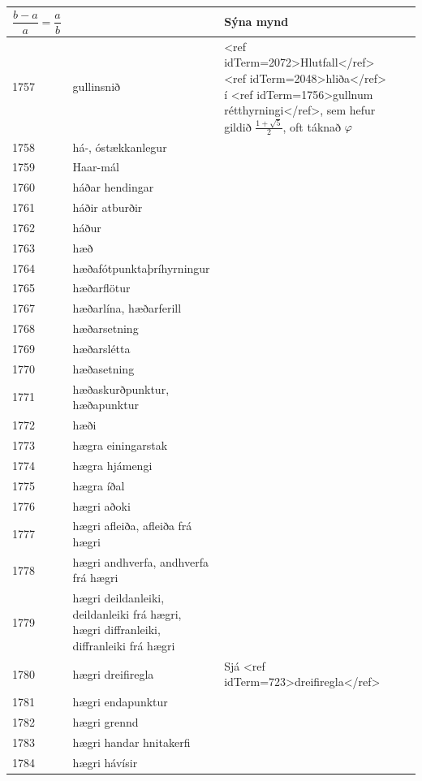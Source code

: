 \begin{longtable}{p{}|p{}|p{}|p{}|p{}}
\[ 
\frac{b-a}{a}=\frac{a}{b}
\] &  & Sýna mynd \\
\hline
1757 & gullinsnið & <ref idTerm=2072>Hlutfall</ref> <ref idTerm=2048>hliða</ref> í <ref idTerm=1756>gullnum rétthyrningi</ref>, sem hefur gildið $\frac{1+\sqrt{5}}{2}$, oft táknað $\varphi$ &  &  \\
\hline
1758 & há-, óstækkanlegur &  &  &  \\
\hline
1759 & Haar-mál &  &  &  \\
\hline
1760 & háðar hendingar &  &  &  \\
\hline
1761 & háðir atburðir &  &  &  \\
\hline
1762 & háður &  &  &  \\
\hline
1763 & hæð &  &  &  \\
\hline
1764 & hæðafótpunktaþríhyrningur &  &  &  \\
\hline
1765 & hæðarflötur &  &  &  \\
\hline
1767 & hæðarlína, hæðarferill &  &  &  \\
\hline
1768 & hæðarsetning &  &  &  \\
\hline
1769 & hæðarslétta &  &  &  \\
\hline
1770 & hæðasetning &  &  &  \\
\hline
1771 & hæðaskurðpunktur, hæðapunktur &  &  &  \\
\hline
1772 & hæði &  &  &  \\
\hline
1773 & hægra einingarstak &  &  &  \\
\hline
1774 & hægra hjámengi &  &  &  \\
\hline
1775 & hægra íðal &  &  &  \\
\hline
1776 & hægri aðoki &  &  &  \\
\hline
1777 & hægri afleiða, afleiða frá hægri &  &  &  \\
\hline
1778 & hægri andhverfa, andhverfa frá hægri &  &  &  \\
\hline
1779 & hægri deildanleiki, deildanleiki frá hægri, hægri diffranleiki, diffranleiki frá hægri &  &  &  \\
\hline
1780 & hægri dreifiregla & Sjá <ref idTerm=723>dreifiregla</ref> &  &  \\
\hline
1781 & hægri endapunktur &  &  &  \\
\hline
1782 & hægri grennd &  &  &  \\
\hline
1783 & hægri handar hnitakerfi &  &  &  \\
\hline
1784 & hægri hávísir &  &  &  \\
\hline

\end{longtable}
